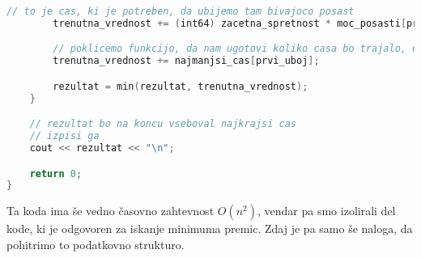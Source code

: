 \begin{lstlisting}[label={lst:code4}, language=C++]
        // to je cas, ki je potreben, da ubijemo tam bivajoco posast
        trenutna_vrednost += (int64) zacetna_spretnost * moc_posasti[prvi_uboj];

        // poklicemo funkcijo, da nam ugotovi koliko casa bo trajalo, da pridemo do konca
        trenutna_vrednost += najmanjsi_cas[prvi_uboj];

        rezultat = min(rezultat, trenutna_vrednost);
    }

    // rezultat bo na koncu vseboval najkrajsi cas
    // izpisi ga
    cout << rezultat << "\n";

    return 0;
}
\end{lstlisting}

Ta koda ima še vedno časovno zahtevnost $O(n^2)$, vendar pa smo izolirali del kode, ki je odgovoren za iskanje minimuma premic.
Zdaj je pa samo še naloga, da pohitrimo to podatkovno strukturo.